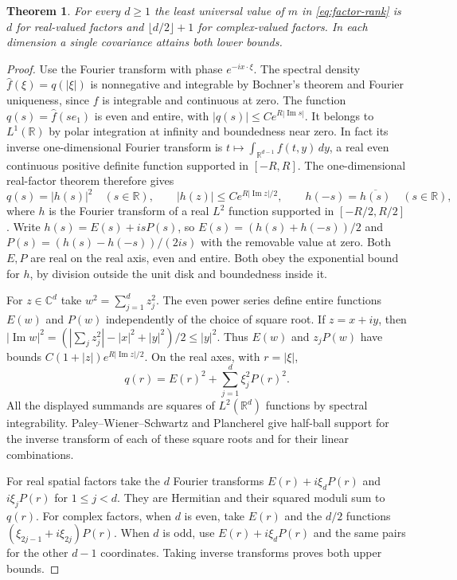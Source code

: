 \documentclass[11pt,a4paper]{article}
\newtheorem{theorem}{Theorem}[section]\newtheorem{lemma}[theorem]{Lemma}\newtheorem{proposition}[theorem]{Proposition}\newtheorem{corollary}[theorem]{Corollary}
\numberwithin{equation}{section}
\begin{document}
\begin{theorem}\label{thm:sharp-factor-number}
For every $d\ge1$ the least universal value of $m$ in \eqref{eq:factor-rank} is $d$ for real-valued factors and $\lfloor d/2\rfloor+1$ for complex-valued factors. In each dimension a single covariance attains both lower bounds.
\end{theorem}
\begin{proof}
Use the Fourier transform with phase $e^{-ix\cdot\xi}$. The spectral density $\widehat f(\xi)=q(|\xi|)$ is nonnegative and integrable by Bochner's theorem and Fourier uniqueness, since $f$ is integrable and continuous at zero. The function $q(s)=\widehat f(se_1)$ is even and entire, with $|q(s)|\le C e^{R|\operatorname{Im}s|}$. It belongs to $L^1(\mathbb R)$ by polar integration at infinity and boundedness near zero. In fact its inverse one-dimensional Fourier transform is $t\mapsto\int_{\mathbb R^{d-1}} f(t,y)\,dy$, a real even continuous positive definite function supported in $[-R,R]$. The one-dimensional real-factor theorem \cite[Theorem~2.1(b)]{EGR} therefore gives
\[
 q(s)=|h(s)|^2\quad(s\in\mathbb R),\qquad
 |h(z)|\le Ce^{R|\operatorname{Im}z|/2},\qquad h(-s)=\overline{h(s)}\quad(s\in\mathbb R),
\]
where $h$ is the Fourier transform of a real $L^2$ function supported in $[-R/2,R/2]$. Write $h(s)=E(s)+isP(s)$, so $E(s)=(h(s)+h(-s))/2$ and $P(s)=(h(s)-h(-s))/(2is)$ with the removable value at zero. Both $E,P$ are real on the real axis, even and entire. Both obey the exponential bound for $h$, by division outside the unit disk and boundedness inside it.

For $z\in\mathbb C^d$ take $w^2=\sum_{j=1}^d z_j^2$. The even power series define entire functions $E(w)$ and $P(w)$ independently of the choice of square root. If $z=x+iy$, then $|\operatorname{Im}w|^2=(|\sum_j z_j^2|-|x|^2+|y|^2)/2\le|y|^2$. Thus $E(w)$ and $z_jP(w)$ have bounds $C(1+|z|)e^{R|\operatorname{Im}z|/2}$. On the real axes, with $r=|\xi|$,
\[
 q(r)=E(r)^2+\sum_{j=1}^{d}\xi_j^2P(r)^2 .
\]
All the displayed summands are squares of $L^2(\mathbb R^d)$ functions by spectral integrability. Paley--Wiener--Schwartz and Plancherel give half-ball support for the inverse transform of each of these square roots and for their linear combinations.

For real spatial factors take the $d$ Fourier transforms $E(r)+i\xi_dP(r)$ and $i\xi_jP(r)$ for $1\le j<d$. They are Hermitian and their squared moduli sum to $q(r)$. For complex factors, when $d$ is even, take $E(r)$ and the $d/2$ functions $(\xi_{2j-1}+i\xi_{2j})P(r)$. When $d$ is odd, use $E(r)+i\xi_dP(r)$ and the same pairs for the other $d-1$ coordinates. Taking inverse transforms proves both upper bounds.


\end{proof}
\end{document}

